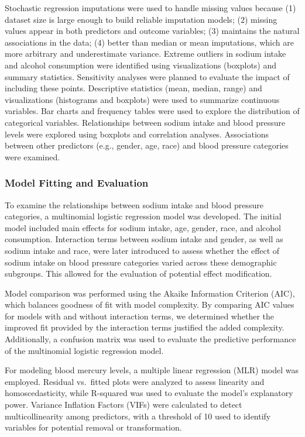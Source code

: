 \documentclass[
  letterpaper,
  DIV=11,
  numbers=noendperiod]{scrartcl}
\begin{document}
Stochastic regression imputations were used to handle missing values
because (1) dataset size is large enough to build reliable imputation
models; (2) missing values appear in both predictors and outcome
variables; (3) maintains the natural associations in the data; (4)
better than median or mean imputations, which are more arbitrary and
underestimate variance. Extreme outliers in sodium intake and alcohol
consumption were identified using visualizations (boxplots) and summary
statistics. Sensitivity analyses were planned to evaluate the impact of
including these points. Descriptive statistics (mean, median, range) and
visualizations (histograms and boxplots) were used to summarize
continuous variables. Bar charts and frequency tables were used to
explore the distribution of categorical variables. Relationships between
sodium intake and blood pressure levels were explored using boxplots and
correlation analyses. Associations between other predictors (e.g.,
gender, age, race) and blood pressure categories were examined.

\subsubsection{Model Fitting and
Evaluation}\label{model-fitting-and-evaluation}

To examine the relationships between sodium intake and blood pressure
categories, a multinomial logistic regression model was developed. The
initial model included main effects for sodium intake, age, gender,
race, and alcohol consumption. Interaction terms between sodium intake
and gender, as well as sodium intake and race, were later introduced to
assess whether the effect of sodium intake on blood pressure categories
varied across these demographic subgroups. This allowed for the
evaluation of potential effect modification.

Model comparison was performed using the Akaike Information Criterion
(AIC), which balances goodness of fit with model complexity. By
comparing AIC values for models with and without interaction terms, we
determined whether the improved fit provided by the interaction terms
justified the added complexity. Additionally, a confusion matrix was
used to evaluate the predictive performance of the multinomial logistic
regression model.

For modeling blood mercury levels, a multiple linear regression (MLR)
model was employed. Residual vs.~fitted plots were analyzed to assess
linearity and homoscedasticity, while R-squared was used to evaluate the
model's explanatory power. Variance Inflation Factors (VIFs) were
calculated to detect multicollinearity among predictors, with a
threshold of 10 used to identify variables for potential removal or
transformation.
\end{document}
